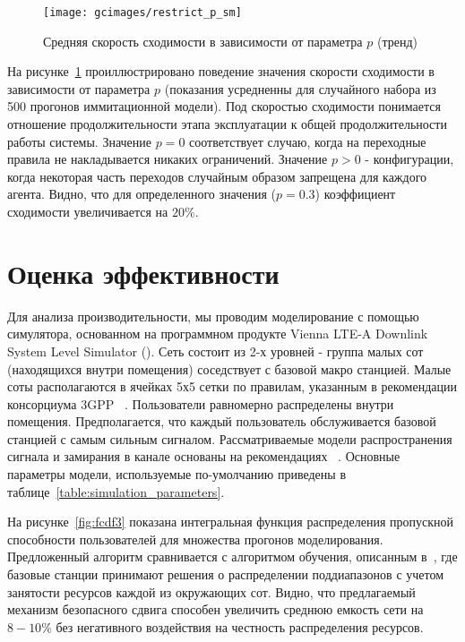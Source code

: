 \begin{figure}
    \centering
    \texttt{[image: gcimages/restrict\_p\_sm]}
    \caption{Средняя скорость сходимости в зависимости от параметра $p$ (тренд)}
    \label{fig:restrict_profit}
\end{figure}

На рисунке~\ref{fig:restrict_profit} проиллюстрировано поведение значения скорости сходимости в зависимости от параметра $p$ (показания усредненны для случайного набора из 500 прогонов иммитационной модели). Под скоростью сходимости понимается отношение продолжительности этапа эксплуатации к общей продолжительности работы системы. Значение $p = 0$ соответствует случаю, когда на переходные правила не накладывается никаких ограничений. Значение $p>0$ - конфигурации, когда некоторая часть переходов случайным образом запрещена для каждого агента. Видно, что для определенного значения ($p=0.3$) коэффициент сходимости увеличивается на $20\%$.


\section{Оценка эффективности}

Для анализа производительности, мы проводим моделирование с помощью симулятора, основанном на программном продукте Vienna LTE-A Downlink System Level Simulator (\cite{VTC2010}). Сеть состоит из 2-х уровней - группа малых сот (находящихся внутри помещения) соседствует с базовой макро станцией. Малые соты располагаются в ячейках 5х5 сетки по правилам, указанным в рекомендации консорциума 3GPP ~\cite{R4-092042}. Пользователи равномерно распределены внутри помещения. Предполагается, что каждый пользователь обслуживается базовой станцией с самым сильным сигналом. Рассматриваемые модели распространения сигнала и замирания в канале основаны на рекомендациях ~\cite{R4-092042}. Основные параметры модели, используемые по-умолчанию приведены в таблице~\ref{table:simulation_parameters}.

На рисунке~\ref{fig:fcdf3} показана интегральная функция распределения пропускной способности пользователей для множества прогонов моделирования. Предложенный алгоритм сравнивается с алгоритмом обучения, описанным в~\cite{mab}, где базовые станции принимают решения о распределении поддиапазонов с учетом занятости ресурсов каждой из окружающих сот. Видно, что предлагаемый механизм безопасного сдвига способен увеличить среднюю емкость сети на $8 - 10\%$ без негативного воздействия на честность распределения ресурсов.

